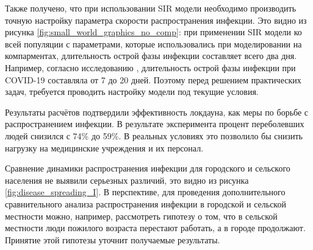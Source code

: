 \documentclass[14pt,a4paper]{article}
\begin{document}
Также получено, что при использовании SIR модели необходимо производить точную настройку параметра скорости распространения инфекции. Это видно из рисунка \ref{fig:small_world_graphics_no_comp}: при применении SIR модели ко всей популяции с параметрами, которые использовались при моделировании на компарментах, длительность острой фазы инфекции составляет всего два дня. Например, согласно исследованию \cite{Adhikari}, длительность острой фазы инфекции при COVID-19 составляла от 7 до 20 дней. Поэтому перед решением практических задач, требуется проводить настройку модели под текущие условия.

Результаты расчётов подтвердили эффективность локдауна, как меры по борьбе с распространением инфекции. В результате эксперимента процент переболевших людей снизился с 74\% до 59\%. В реальных условиях это позволило бы снизить нагрузку на медицинские учреждения и их персонал.

Сравнение динамики распространения инфекции для городского и сельского населения не выявили серьезных различий, это видно из рисунка \ref{fig:disease_spreading_I}. В перспективе, для проведения дополнительного сравнительного анализа распространения инфекции в городской и сельской местности можно, например, рассмотреть гипотезу о том, что в сельской местности люди пожилого возраста перестают работать, а в городе продолжают. Принятие этой гипотезы уточнит получаемые результаты.



\newpage 
\end{document}
